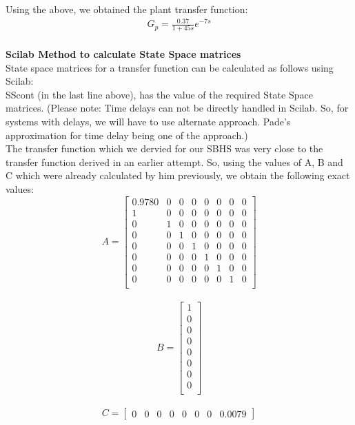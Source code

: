 Using the above, we obtained the plant transfer function: 
\begin{align}
G_{p}=\frac{0.37}{1+45s}e^{-7s} \label{eqn2}
\end{align}
\\
\textbf{Scilab Method to calculate State Space matrices}\\
State space matrices for a transfer function can be calculated as follows using Scilab: \\

SScont (in the last line above), has the value of the required State Space matrices. (Please note: Time delays can not be directly handled in Scilab. So, for systems with delays, we will have to use alternate approach. Pade's approximation for time delay being one of the approach.) \\
The transfer function which we dervied for our SBHS was very close to the transfer function derived in an earlier attempt. So, using the values of A, B and C which were already calculated by him previously, we obtain the following exact values:
\\
\[
A =
\left[ {\begin{array}{cccccccc}
0.9780 & 0 & 0 & 0 & 0 & 0 & 0 & 0  \\
1 & 0 & 0 & 0 & 0 & 0 & 0 & 0  \\
0 & 1 & 0 & 0 & 0 & 0 & 0 & 0  \\
0 & 0 & 1 & 0 & 0 & 0 & 0 & 0  \\
0 & 0 & 0 & 1 & 0 & 0 & 0 & 0  \\
0 & 0 & 0 & 0 & 1 & 0 & 0 & 0  \\
0 & 0 & 0 & 0 & 0 & 1 & 0 & 0  \\
0 & 0 & 0 & 0 & 0 & 0 & 1 & 0  \\
\end{array} } \right]
\]
\\
\[
B =
\left[ {\begin{array}{c}
 1  \\
0 \\
0  \\
0  \\
0  \\
0  \\
0  \\
0  \\
 \end{array} } \right]
\]
\\
\[
C =
\left[ {\begin{array}{cccccccc}
 0  & 0 & 0 & 0 & 0 & 0 & 0 & 0.0079
 \end{array} } \right]
\]





